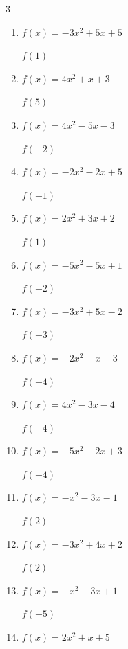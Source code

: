 \begin{multicols}{3}
\begin{enumerate}
$f(-1)$
        \phantom{$= 2$}

  \item $f(x)=-3x^{2}+5x+5$

$f(1)$
        \phantom{$= 7$}

  \item $f(x)=4x^{2}+x+3$

$f(5)$
        \phantom{$= 108$}

  \item $f(x)=4x^{2}-5x-3$

$f(-2)$
        \phantom{$= 23$}

  \item $f(x)=-2x^{2}-2x+5$

$f(-1)$
        \phantom{$= 5$}

  \item $f(x)=2x^{2}+3x+2$

$f(1)$
        \phantom{$= 7$}

  \item $f(x)=-5x^{2}-5x+1$

$f(-2)$
        \phantom{$= -9$}

  \item $f(x)=-3x^{2}+5x-2$

$f(-3)$
        \phantom{$= -44$}

  \item $f(x)=-2x^{2}-x-3$

$f(-4)$
        \phantom{$= -31$}

  \item $f(x)=4x^{2}-3x-4$

$f(-4)$
        \phantom{$= 72$}

  \item $f(x)=-5x^{2}-2x+3$

$f(-4)$
        \phantom{$= -69$}

  \item $f(x)=-x^{2}-3x-1$

$f(2)$
        \phantom{$= -11$}

\columnbreak %

  \item $f(x)=-3x^{2}+4x+2$

$f(2)$
        \phantom{$= -2$}

  \item $f(x)=-x^{2}-3x+1$

$f(-5)$
        \phantom{$= -9$}

  \item $f(x)=2x^{2}+x+5$


\end{enumerate}
\end{multicols}
